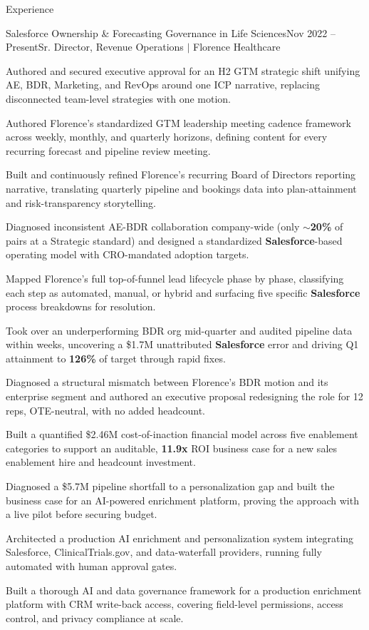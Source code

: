 \documentclass{resume}
\begin{document}
\begin{rSection}{Experience}
\begin{rSubsection}{Salesforce Ownership \& Forecasting Governance in Life Sciences}{\textcolor{black!60}{Nov 2022 -- Present}}{Sr. Director, Revenue Operations $\vert$ Florence Healthcare}{}
\item Authored and secured executive approval for an H2 GTM strategic shift unifying AE, BDR, Marketing, and RevOps around one ICP narrative, replacing disconnected team-level strategies with one motion.
\item Authored Florence's standardized GTM leadership meeting cadence framework across weekly, monthly, and quarterly horizons, defining content for every recurring forecast and pipeline review meeting.
\item Built and continuously refined Florence's recurring Board of Directors reporting narrative, translating quarterly pipeline and bookings data into plan-attainment and risk-transparency storytelling.
\item Diagnosed inconsistent AE-BDR collaboration company-wide (only $\sim$\textbf{20\%} of pairs at a Strategic standard) and designed a standardized \textbf{Salesforce}-based operating model with CRO-mandated adoption targets.
\item Mapped Florence's full top-of-funnel lead lifecycle phase by phase, classifying each step as automated, manual, or hybrid and surfacing five specific \textbf{Salesforce} process breakdowns for resolution.
\item Took over an underperforming BDR org mid-quarter and audited pipeline data within weeks, uncovering a \$1.7M unattributed \textbf{Salesforce} error and driving Q1 attainment to \textbf{126\%} of target through rapid fixes.
\item Diagnosed a structural mismatch between Florence's BDR motion and its enterprise segment and authored an executive proposal redesigning the role for 12 reps, OTE-neutral, with no added headcount.
\item Built a quantified \$2.46M cost-of-inaction financial model across five enablement categories to support an auditable, \textbf{11.9x} ROI business case for a new sales enablement hire and headcount investment.
\item Diagnosed a \$5.7M pipeline shortfall to a personalization gap and built the business case for an AI-powered enrichment platform, proving the approach with a live pilot before securing budget.
\item Architected a production AI enrichment and personalization system integrating Salesforce, ClinicalTrials.gov, and data-waterfall providers, running fully automated with human approval gates.
\item Built a thorough AI and data governance framework for a production enrichment platform with CRM write-back access, covering field-level permissions, access control, and privacy compliance at scale.
\end{rSubsection}


\end{rSection}
\end{document}
